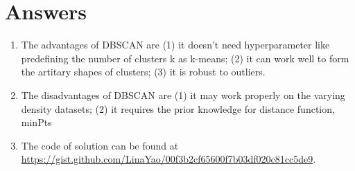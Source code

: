 \section{Answers}

\begin{enumerate}
\item The advantages of DBSCAN are (1) it doesn't need hyperparameter like predefining the number of clusters k as k-means; (2) it can work well to form the artitary shapes of clusters; (3) it is robust to outliers. 
\item The disadvantages of DBSCAN are (1) it may work properly on the varying density datasets; (2) it requires the prior knowledge for distance function, minPts
\item The code of solution can be found at \url{https://gist.github.com/LinaYao/00f3b2cf65600f7b03df020c81cc5de9}.
\end{enumerate} 






